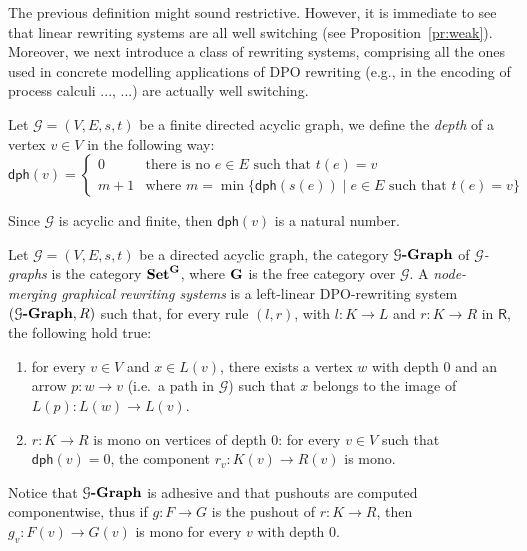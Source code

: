 \documentclass[a4paper,UKenglish,cleveref,pdftex, thm-restate,numberwithinsect,anonymous]{lipics}
\newcommand{\gph}[1]{\mathcal{G}\textbf{\textup{-Graph}}}
\newcommand{\dph}{\mathsf{dph}}
\def\R{\mathsf{R}}
\def\G{\textbf {\textup{G}}}
\def\Set{\textbf {\textup{Set}}}
\begin{document}
The previous definition might sound restrictive. However, it is immediate to see that linear rewriting systems are all well switching (see Proposition~\ref{pr:weak}).
%
Moreover, we next introduce a class of rewriting systems, comprising
all the ones used in concrete modelling applications of DPO rewriting
(e.g., in the encoding of process calculi ..., ...) are 
actually well switching.

\begin{definition}
Let $\mathcal{G}=(V, E, s, t)$ be a finite directed acyclic graph, we define the \emph{depth} of a vertex $v\in V$ in the following way:
\[\dph(v)=\begin{cases}
0 & \text{there is no $e\in E$ such that $t(e)=v$}\\
m+1 &\text{where } m=\min\{\dph(s(e)) \mid e\in E \text{ such that } t(e)=v \} 
\end{cases}\]
\end{definition}


\begin{remark}
Since $\mathcal{G}$ is acyclic and finite, then $\dph(v)$ is a natural number.
\end{remark}

\begin{definition}
Let $\mathcal{G}=(V, E, s, t)$ be a directed acyclic graph, the category  $\gph{G}$ of \emph{$\mathcal{G}$-graphs} is the category $\Set^{\G}$, where $\G$ is the free category over $\mathcal{G}$. A \emph{node-merging graphical rewriting systems} is a left-linear DPO-rewriting system $(\gph{G}, \R)$ such that, for every rule $(l,r)$, with $l\colon K\to L$ and $r\colon K\to R$  in $\R$, the following hold true:
\begin{enumerate}
	\item for every $v\in V$ and $x\in L(v)$, there exists a vertex $w$ with depth $0$ and an arrow $p\colon w\to v$ (i.e.~a path in $\mathcal{G}$) such that  $x$ belongs to the image of $L(p)\colon L(w)\to L(v)$.
	\item $r\colon K\to R$ is mono on vertices of depth $0$: for every $v\in V$ such that $\dph(v)=0$, the component $r_v:K(v)\to R(v)$ is mono.
\end{enumerate}
\end{definition}

\begin{remark}\label{rem:po}
	Notice that $\gph{G}$ is adhesive and that pushouts are computed componentwise, thus if $g\colon F\to G$ is the pushout of $r\colon K\to R$, then $g_v\colon F(v)\to G(v)$ is mono for every $v$ with depth $0$.
\end{remark}
\end{document}
